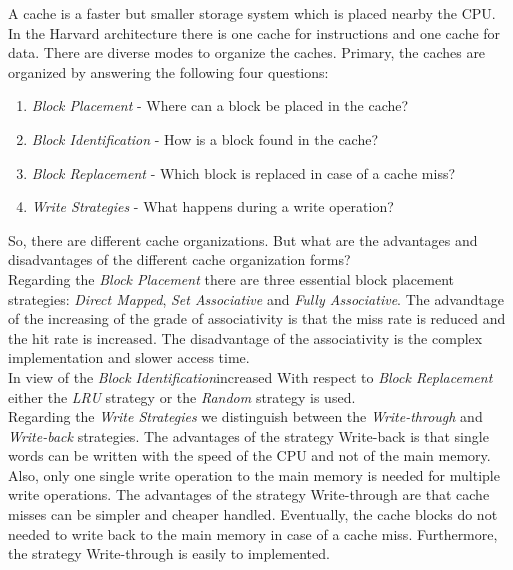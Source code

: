 A cache is a faster but smaller storage system which is placed nearby the CPU. In the Harvard architecture there is one cache for instructions and one cache for data. There are diverse modes to organize the caches. Primary, the caches are organized by answering the following four questions:
\begin{enumerate}
	\item \textit{Block Placement} - Where can a block be placed in the cache?
	\item \textit{Block Identification} - How is a block found in the cache?
	\item \textit{Block Replacement} - Which block is replaced in case of a cache miss?
	\item \textit{Write Strategies} - What happens during a write operation?
\end{enumerate}
So, there are different cache organizations. But what are the advantages and disadvantages of the different cache organization forms?\\
Regarding the \textit{Block Placement} there are three essential block placement strategies: \textit{Direct Mapped}, \textit{Set Associative} and \textit{Fully Associative}. The advandtage of the increasing of the grade of associativity is that the miss rate is reduced and the hit rate is increased. The disadvantage of the associativity is the complex implementation and slower access time.\\
In view of the \textit{Block Identification}increased
With respect to \textit{Block Replacement} either the \textit{LRU} strategy or the \textit{Random} strategy is used.\\ 
Regarding the \textit{Write Strategies} we distinguish between the \textit{Write-through} and \textit{Write-back} strategies. The advantages of the strategy Write-back is that single words can be written with the speed of the CPU and not of the main memory. Also, only one single write operation to the main memory is needed for multiple write operations. The advantages of the strategy Write-through are that cache misses can be simpler and cheaper handled. Eventually, the cache blocks do not needed to write back to the main memory in case of a cache miss. Furthermore, the strategy Write-through is easily to implemented.



